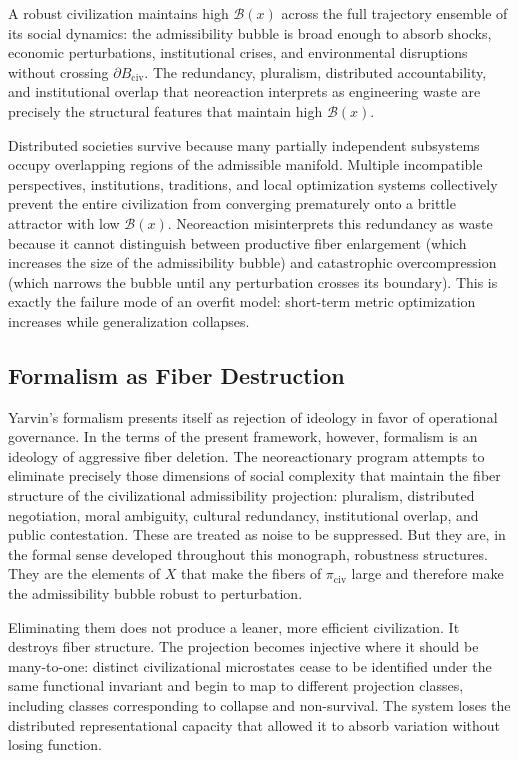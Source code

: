 \documentclass[12pt, a4paper]{article}
\theoremstyle{essaystyle}
\begin{document}
A robust civilization maintains high $\mathcal{B}(x)$ across the full trajectory
ensemble of its social dynamics: the admissibility bubble is broad enough to absorb
shocks, economic perturbations, institutional crises, and environmental disruptions
without crossing $\partial B_{\mathrm{civ}}$. The redundancy, pluralism, distributed
accountability, and institutional overlap that neoreaction interprets as engineering
waste are precisely the structural features that maintain high $\mathcal{B}(x)$.

Distributed societies survive because many partially independent subsystems occupy
overlapping regions of the admissible manifold. Multiple incompatible perspectives,
institutions, traditions, and local optimization systems collectively prevent the
entire civilization from converging prematurely onto a brittle attractor with low
$\mathcal{B}(x)$. Neoreaction misinterprets this redundancy as waste because it
cannot distinguish between productive fiber enlargement (which increases the size
of the admissibility bubble) and catastrophic overcompression (which narrows the
bubble until any perturbation crosses its boundary). This is exactly the failure
mode of an overfit model: short-term metric optimization increases while
generalization collapses.

\subsection{Formalism as Fiber Destruction}

Yarvin's formalism presents itself as rejection of ideology in favor of operational
governance. In the terms of the present framework, however, formalism is an
ideology of aggressive fiber deletion. The neoreactionary program attempts to
eliminate precisely those dimensions of social complexity that maintain the
fiber structure of the civilizational admissibility projection: pluralism,
distributed negotiation, moral ambiguity, cultural redundancy, institutional
overlap, and public contestation. These are treated as noise to be suppressed.
But they are, in the formal sense developed throughout this monograph, robustness
structures. They are the elements of $X$ that make the fibers of $\pi_{\mathrm{civ}}$
large and therefore make the admissibility bubble robust to perturbation.

Eliminating them does not produce a leaner, more efficient civilization.
It destroys fiber structure. The projection becomes injective where it should be
many-to-one: distinct civilizational microstates cease to be identified under the
same functional invariant and begin to map to different projection classes, including
classes corresponding to collapse and non-survival. The system loses the distributed
representational capacity that allowed it to absorb variation without losing function.
\end{document}
